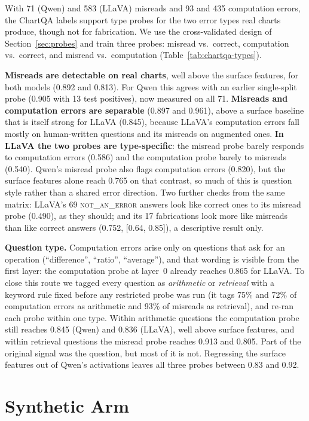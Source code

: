 \documentclass[11pt]{article}
\newcommand{\cls}[1]{\textsc{#1}}
\begin{document}
With 71 (Qwen) and 583 (LLaVA) misreads and 93 and 435 computation errors, the
ChartQA labels support type probes for the two error types real charts produce,
though not for fabrication. We use the cross-validated design of
Section~\ref{sec:probes} and train three probes: misread vs.\ correct,
computation vs.\ correct, and misread vs.\ computation (Table~\ref{tab:chartqa-types}).

\textbf{Misreads are detectable on real charts}, well above the surface features,
for both models (0.892 and 0.813). For Qwen this agrees with an earlier
single-split probe (0.905 with 13 test positives), now measured on all 71.
\textbf{Misreads and computation errors are separable} (0.897 and 0.961), above
a surface baseline that is itself strong for LLaVA (0.845), because LLaVA's
computation errors fall mostly on human-written questions and its misreads on
augmented ones. \textbf{In LLaVA the two probes are type-specific}: the misread
probe barely responds to computation errors (0.586) and the computation probe
barely to misreads (0.540). Qwen's misread probe also flags computation errors
(0.820), but the surface features alone reach 0.765 on that contrast, so much of
this is question style rather than a shared error direction. Two further checks
from the same matrix: LLaVA's 69 \cls{not\_an\_error} answers look like correct
ones to its misread probe (0.490), as they should; and its 17 fabrications look
more like misreads than like correct answers (0.752, [0.64, 0.85]), a
descriptive result only.

\textbf{Question type.} Computation errors arise only on questions that ask for
an operation (``difference'', ``ratio'', ``average''), and that wording is
visible from the first layer: the computation probe at layer~0 already reaches
0.865 for LLaVA. To close this route we tagged every question as
\emph{arithmetic} or \emph{retrieval} with a keyword rule fixed before any
restricted probe was run (it tags 75\% and 72\% of computation errors as
arithmetic and 93\% of misreads as retrieval), and re-ran each probe within one
type. Within arithmetic questions the computation probe still reaches 0.845
(Qwen) and 0.836 (LLaVA), well above surface features, and within retrieval
questions the misread probe reaches 0.913 and 0.805. Part of the original signal
was the question, but most of it is not. Regressing the surface features out of
Qwen's activations leaves all three probes between 0.83 and 0.92.

\section{Synthetic Arm}
\label{sec:synth}
\end{document}
